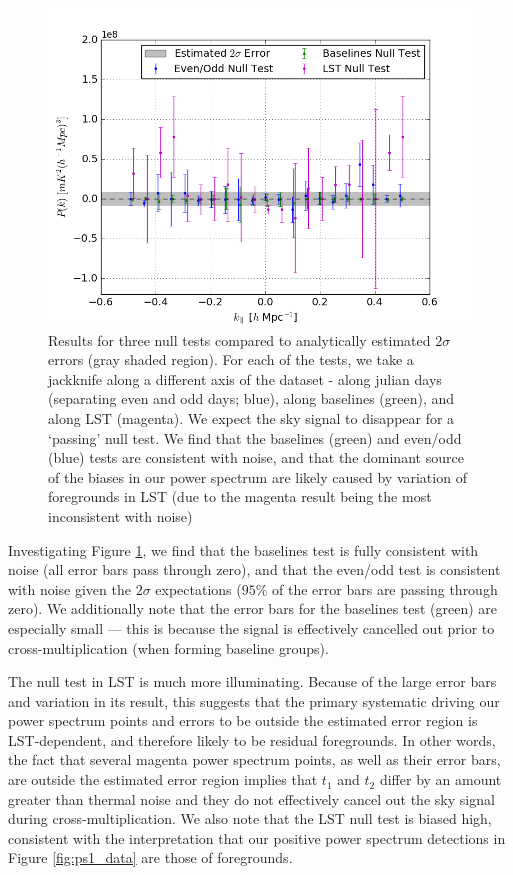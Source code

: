 \documentclass[preprint2,numberedappendix,tighten]{aastex6}  %
\begin{document}
\begin{figure}
	\centering
	\includegraphics[width=1\textwidth]{plots/null_zoom.png}
	\caption{Results for three null tests compared to analytically estimated 
$2\sigma$ errors (gray shaded region). For each of the tests, we take a jackknife along a different axis of the dataset - along julian days (separating 
even and odd days; blue), along baselines (green), and along LST (magenta). We expect the sky signal to disappear for a `passing' null test.
We find that the baselines (green) and even/odd (blue) tests are consistent with noise, and that the dominant source of the biases in our power spectrum are likely caused by variation of foregrounds in LST (due to the magenta result being the most inconsistent with noise)}
	\label{fig:null}
\end{figure}

Investigating Figure \ref{fig:null}, we find that the baselines test is fully consistent with noise (all error bars pass through zero), and that the even/odd test is consistent with noise given the $2\sigma$ expectations ($95\%$ of the error bars are passing through zero). We additionally note that the error bars for the baselines test (green) are especially small --- this is because the signal is effectively cancelled out prior to cross-multiplication (when forming baseline groups). 

The null test in LST is much more illuminating. Because of the large error bars and variation in its result, this suggests that the primary systematic driving our power spectrum points and errors to be outside the 
estimated error region is LST-dependent, and therefore likely to be residual foregrounds. In other words, the fact that several magenta power spectrum points, as well as their error bars, are outside the estimated error region implies that $t_{1}$ and 
$t_{2}$ differ by an amount greater than thermal noise and they do not effectively cancel out the sky signal during cross-multiplication. We also note that the LST null test is biased high, consistent with the interpretation that our positive power spectrum detections in Figure \ref{fig:ps1_data} are those of foregrounds.
\end{document}
